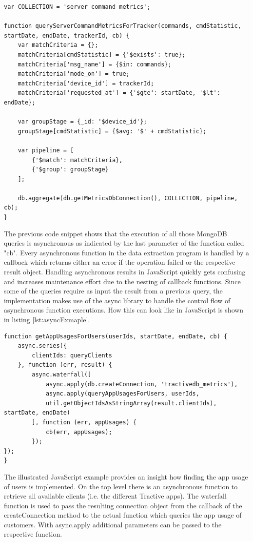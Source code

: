 \begin{lstlisting}[caption={Aggregation query on server command metrics collection}, label={lst:aggregationServerCommands}]
var COLLECTION = 'server_command_metrics';

function queryServerCommandMetricsForTracker(commands, cmdStatistic, startDate, endDate, trackerId, cb) {
	var matchCriteria = {};
	matchCriteria[cmdStatistic] = {'$exists': true};
	matchCriteria['msg_name'] = {$in: commands};
	matchCriteria['mode_on'] = true;
	matchCriteria['device_id'] = trackerId;
	matchCriteria['requested_at'] = {'$gte': startDate, '$lt': endDate};
	
	var groupStage = {_id: '$device_id'};
	groupStage[cmdStatistic] = {$avg: '$' + cmdStatistic};
	
	var pipeline = [
		{'$match': matchCriteria},
		{'$group': groupStage}
	];
	
	db.aggregate(db.getMetricsDbConnection(), COLLECTION, pipeline, cb);
}
\end{lstlisting}

The previous code snippet shows that the execution of all those MongoDB queries is asynchronous as indicated by the last parameter of the function called "cb". Every asynchronous function in the data extraction program is handled by a callback which returns either an error if the operation failed or the respective result object. Handling asynchronous results in JavaScript quickly gets confusing and increases maintenance effort due to the nesting of callback functions. Since some of the queries require as input the result from a previous query, the implementation makes use of the async library to handle the control flow of asynchronous function executions. How this can look like in JavaScript is shown in listing \ref{lst:asyncExmaple}.

\begin{lstlisting}[caption={Example of using async for handling the control flow of asnychronous database queries}, label={lst:asyncExample}]
function getAppUsagesForUsers(userIds, startDate, endDate, cb) {
	async.series({
		clientIds: queryClients
	}, function (err, result) {
		async.waterfall([
			async.apply(db.createConnection, 'tractivedb_metrics'),
			async.apply(queryAppUsagesForUsers, userIds, 
			util.getObjectIdsAsStringArray(result.clientIds), startDate, endDate)
		], function (err, appUsages) {
			cb(err, appUsages);
		});
});
}
\end{lstlisting}

The illustrated JavaScript example provides an insight how finding the app usage of users is implemented. On the top level there is an asynchronous function to retrieve all available clients (i.e. the different Tractive apps). The waterfall function is used to pass the resulting connection object from the callback of the createConnection method to the actual function which queries the app usage of customers. With async.apply additional parameters can be passed to the respective function. 

